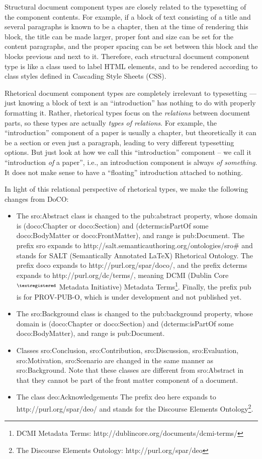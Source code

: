 Structural document component types are closely related to the typesetting of the component contents. For example, if a block of text consisting of a title and several paragraphs is known to be a chapter, then at the time of rendering this block, the title can be made larger, proper font and size can be set for the content paragraphs, and the proper spacing can be set between this block and the blocks previous and next to it. Therefore, each structural document component type is like a class used to label HTML elements, and to be rendered according to class styles defined in Cascading Style Sheets (CSS).

Rhetorical document component types are completely irrelevant to typesetting --- just knowing a block of text is an ``introduction'' has nothing to do with properly formatting it. Rather, rhetorical types focus on the \emph{relations} between document parts, so these types are actually \emph{types of relations}. For example, the ``introduction'' component of a paper is usually a chapter, but theoretically it can be a section or even just a paragraph, leading to very different typesetting options. But just look at how we call this ``introduction'' component -- we call it ``introduction \emph{of} a paper'', i.e., an introduction component is always \emph{of something}. It does not make sense to have a ``floating'' introduction attached to nothing. 

In light of this relational perspective of rhetorical types, we make the following changes from DoCO:

\begin{itemize}
	\item The sro:Abstract class is changed to the pub:abstract property, whose domain is (doco:Chapter or doco:Section) and (dcterms:isPartOf some doco:BodyMatter or doco:FrontMatter), and range is pub:Document. The prefix sro expands to http://salt.semanticauthoring.org/ontologies/sro\# and stands for SALT (Semantically Annotated \LaTeX \cite{groza2007salt}) Rhetorical Ontology. The prefix doco expands to http://purl.org/spar/doco/, and the prefix dcterms expands to http://purl.org/dc/terms/, meaning DCMI (Dublin Core$^{\textregistered}$ Metadata Initiative) Metadata Terms\footnote{DCMI Metadata Terms: http://dublincore.org/documents/dcmi-terms/}. Finally, the prefix pub is for PROV-PUB-O, which is under development and not published yet.
	\item The sro:Background class is changed to the pub:background property, whose domain is (doco:Chapter or doco:Section) and (dcterms:isPartOf some doco:BodyMatter), and range is pub:Document. 
	\item Classes sro:Conclusion, sro:Contribution, sro:Discussion, sro:Evaluation, sro:Motivation, sro:Scenario are changed in the same manner as sro:Background. Note that these classes are different from sro:Abstract in that they cannot be part of the front matter component of a document.
	\item The class deo:Acknowledgements  The prefix deo here expands to http://purl.org/spar/deo/ and stands for the Discourse Elements Ontology\footnote{The Discourse Elements Ontology: http://purl.org/spar/deo}.
\end{itemize}

